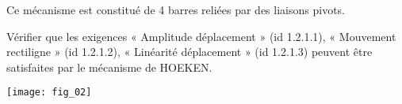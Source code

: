 Ce mécanisme est constitué de 4 barres reliées par des liaisons pivots.



\begin{obj}
Vérifier que les exigences « Amplitude déplacement » (id 1.2.1.1), « Mouvement
rectiligne » (id 1.2.1.2), « Linéarité déplacement » (id 1.2.1.3) peuvent être satisfaites par le mécanisme de HOEKEN.
\end{obj}


\begin{center}
\texttt{[image: fig\_02]}
\end{center}


\fi

